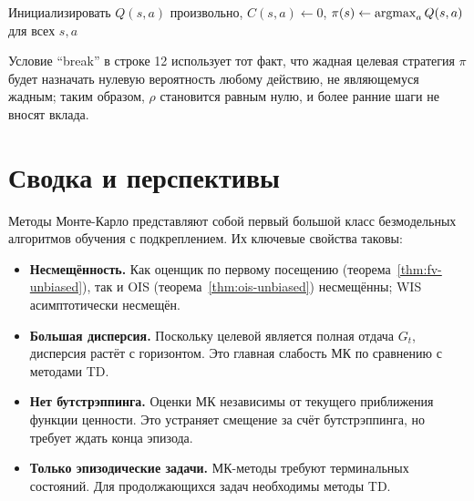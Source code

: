 \begin{algorithm}[ht]
\caption{Управление МК на другой стратегии (WIS)}
\label{alg:off-policy-mc-control}
Инициализировать $Q(s,a)$ произвольно, $C(s,a) \leftarrow 0$, $\pi(s) \leftarrow \operatorname*{argmax}_a Q(s,a)$ для всех $s,a$\;
\end{algorithm}

Условие ``break'' в строке 12 использует тот факт, что жадная целевая стратегия $\pi$ будет назначать нулевую вероятность любому действию, не являющемуся жадным; таким образом, $\rho$ становится равным нулю, и более ранние шаги не вносят вклада.

\section{Сводка и перспективы}
\label{sec:mc-summary}

Методы Монте-Карло представляют собой первый большой класс безмодельных алгоритмов обучения с подкреплением.  Их ключевые свойства таковы:
\begin{itemize}[leftmargin=*]
  \item \textbf{Несмещённость.}  Как оценщик по первому посещению (теорема~\ref{thm:fv-unbiased}), так и OIS (теорема~\ref{thm:ois-unbiased}) несмещённы; WIS асимптотически несмещён.
  \item \textbf{Большая дисперсия.}  Поскольку целевой является полная отдача $G_t$, дисперсия растёт с горизонтом.  Это главная слабость МК по сравнению с методами TD.
  \item \textbf{Нет бутстрэппинга.}  Оценки МК независимы от текущего приближения функции ценности.  Это устраняет смещение за счёт бутстрэппинга, но требует ждать конца эпизода.
  \item \textbf{Только эпизодические задачи.}  МК-методы требуют терминальных состояний.  Для продолжающихся задач необходимы методы TD.
\end{itemize}

